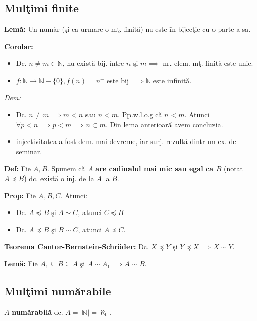 \documentclass{article}
\begin{document}
\subsection{Mul\c timi finite}

\textbf{Lem\u a:} Un num\u ar (\c si ca urmare o m\c t. finit\u a) nu este \^ in bijec\c tie cu o parte a sa.

\textbf{Corolar:}
\begin{itemize}
    \item Dc. $n\neq m \in \mathbb N$, nu exist\u a bij. \^ intre $n$ \c si $m \implies$ nr. elem. m\c t. finit\u a este unic.
    \item $f:\mathbb N \rightarrow \mathbb N-\{0\}, f(n)=n^+$ este bij $\implies \mathbb N$ este infinit\u a.
\end{itemize}

\textit{Dem:}
\begin{itemize}
    \item Dc. $n\neq m \implies m<n$ sau $n<m$. Pp.w.l.o.g c\u a $n<m$. Atunci $\forall p<n \implies p<m \implies n\subset m$. Din lema anterioar\u a avem concluzia.
    \item injectivitatea a fost dem. mai devreme, iar surj. rezult\u a dintr-un ex. de seminar.
\end{itemize}

\textbf{Def:} Fie $A,B$. Spunem c\u a $A$ \textbf{are cadinalul mai mic sau egal ca }$B$ (notat $A \preceq B$) dc. exist\u a o inj. de la $A$ la $B$.

\textbf{Prop:} Fie $A,B,C.$ Atunci:
\begin{itemize}
    \item Dc. $A\preceq B$ \c si $A\sim C$, atunci $C\preceq B$
    \item Dc. $A \preceq B$ \c si $B\sim C$, atunci $A\preceq C$.
    
\end{itemize}

\textbf{Teorema Cantor-Bernstein-Schr\" oder:} Dc. $X\preceq Y$ \c si $Y\preceq X \implies X\sim Y$.

\textbf{Lem\u a:} Fie $A_1 \subseteq B \subseteq A$ \c si $A\sim A_1 \implies A\sim B$.

\subsection{Mul\c timi num\u arabile}

$A$ \textbf{num\u arabil\u a} dc. $A=|\mathbb N|=$\textbf{$\aleph_0$}.
\end{document}
